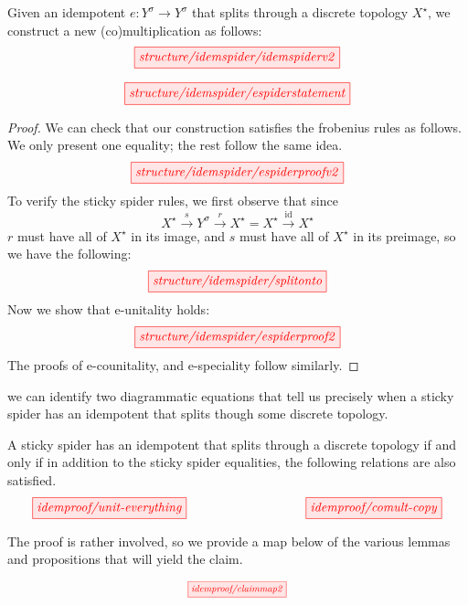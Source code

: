 \begin{construction}
Given an idempotent $e: Y^\sigma \rightarrow Y^\sigma$ that splits through a discrete topology $X^\star$, we construct a new (co)multiplication as follows:
\[\scalebox{1}{\tikzfig{structure/idemspider/idemspiderv2}}\]
\end{construction}

\begin{proposition}\label{prop:splitmeanssticky}
\[\scalebox{1}{\tikzfig{structure/idemspider/espiderstatement}}\]
\begin{proof}
We can check that our construction satisfies the frobenius rules as follows. We only present one equality; the rest follow the same idea.
\[\scalebox{1}{\tikzfig{structure/idemspider/espiderproofv2}}\]
To verify the sticky spider rules, we first observe that since \[X^\star \overset{s}{\rightarrow} Y^\sigma \overset{r}{\rightarrow} X^\star = X^\star \overset{\mathop{id}}{\rightarrow} X^\star\]
$r$ must have all of $X^\star$ in its image, and $s$ must have all of $X^\star$ in its preimage, so we have the following:
\[\scalebox{1}{\tikzfig{structure/idemspider/splitonto}}\]
Now we show that e-unitality holds:
\[\scalebox{1}{\tikzfig{structure/idemspider/espiderproof2}}\]
The proofs of e-counitality, and e-speciality follow similarly.
\end{proof}
\end{proposition}

 we can identify two diagrammatic equations that tell us precisely when a sticky spider has an idempotent that splits though some discrete topology.

\begin{theorem}\label{thm:stickygraphical}
A sticky spider has an idempotent that splits through a discrete topology if and only if in addition to the sticky spider equalities, the following relations are also satisfied.
\[\scalebox{1}{\tikzfig{idemproof/unit-everything}} \quad\quad\quad\quad\quad\quad\quad\quad \scalebox{1}{\tikzfig{idemproof/comult-copy}}\]
\end{theorem}

The proof is rather involved, so we provide a map below of the various lemmas and propositions that will yield the claim.

\[\scalebox{0.75}{\tikzfig{idemproof/claimmap2}}\]

